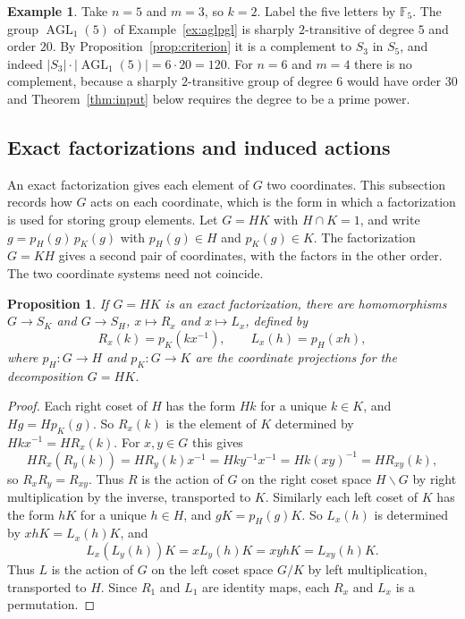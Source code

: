 \documentclass[12pt,letterpaper]{article}
\numberwithin{equation}{section}
\newtheorem{proposition}[theorem]{Proposition}
\theoremstyle{definition}
\newtheorem{example}[theorem]{Example}
\DeclareMathOperator{\agll}{AGL}
\begin{document}
\begin{example}\label{ex:n5m3}
Take $n=5$ and $m=3$, so $k=2$. Label the five letters by $\mathbb F_5$. The group $\agll_1(5)$ of Example~\ref{ex:aglpgl} is sharply $2$-transitive of degree $5$ and order $20$. By Proposition~\ref{prop:criterion} it is a complement to $S_3$ in $S_5$, and indeed $|S_3|\cdot|\agll_1(5)|=6\cdot20=120$. For $n=6$ and $m=4$ there is no complement, because a sharply $2$-transitive group of degree $6$ would have order $30$ and Theorem~\ref{thm:input} below requires the degree to be a prime power.
\end{example}

\subsection{Exact factorizations and induced actions}
An exact factorization gives each element of $G$ two coordinates. This subsection records how $G$ acts on each coordinate, which is the form in which a factorization is used for storing group elements. Let $G=HK$ with $H\cap K=1$, and write $g=p_H(g)\,p_K(g)$ with $p_H(g)\in H$ and $p_K(g)\in K$. The factorization $G=KH$ gives a second pair of coordinates, with the factors in the other order. The two coordinate systems need not coincide.
\begin{proposition}\label{prop:actions}
If $G=HK$ is an exact factorization, there are homomorphisms $G\to S_K$ and $G\to S_H$, $x\mapsto R_x$ and $x\mapsto L_x$, defined by
\[
R_x(k)=p_K(kx^{-1}),\qquad L_x(h)=p_H(xh),
\]
where $p_H\colon G\to H$ and $p_K\colon G\to K$ are the coordinate projections for the decomposition $G=HK$.
\end{proposition}
\begin{proof}
Each right coset of $H$ has the form $Hk$ for a unique $k\in K$, and $Hg=Hp_K(g)$. So $R_x(k)$ is the element of $K$ determined by $Hkx^{-1}=HR_x(k)$. For $x,y\in G$ this gives
\[
HR_x(R_y(k))=HR_y(k)x^{-1}=Hky^{-1}x^{-1}=Hk(xy)^{-1}=HR_{xy}(k),
\]
so $R_xR_y=R_{xy}$. Thus $R$ is the action of $G$ on the right coset space $H\backslash G$ by right multiplication by the inverse, transported to $K$. Similarly each left coset of $K$ has the form $hK$ for a unique $h\in H$, and $gK=p_H(g)K$. So $L_x(h)$ is determined by $xhK=L_x(h)K$, and
\[
L_x(L_y(h))K=xL_y(h)K=xyhK=L_{xy}(h)K.
\]
Thus $L$ is the action of $G$ on the left coset space $G/K$ by left multiplication, transported to $H$. Since $R_1$ and $L_1$ are identity maps, each $R_x$ and $L_x$ is a permutation.
\end{proof}
\end{document}
